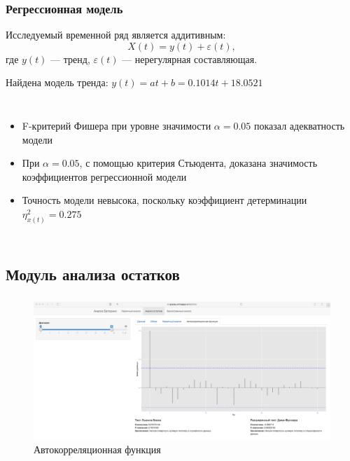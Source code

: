 \documentclass[notheorems]{beamer}
\theoremstyle{definition}
\theoremstyle{example}
\theoremstyle{plain}
\begin{document}
\begin{frame}
  \frametitle{Регрессионная модель}
  Исследуемый временной ряд является аддитивным:
  \begin{equation}
    X(t) = y(t) + \varepsilon(t),
  \end{equation}
  где $ y(t) $ --- тренд, $ \varepsilon(t) $ --- нерегулярная составляющая.

  \vspace{0.2em}

  \begin{center}
    Найдена модель тренда: $ y(t) = at + b = 0.1014t + 18.0521 $
  \end{center}
  \begin{columns}[c]
  {\footnotesize
  \begin{itemize}
    \item F-критерий Фишера при уровне значимости $ \alpha = 0.05 $ показал адекватность модели
    \item При $ \alpha=0.05 $, с помощью критерия Стьюдента, доказана значимость коэффициентов регрессионной модели
    \item Точность модели невысока, поскольку коэффициент детерминации $ \eta^2_{x(t)} = 0.275 $
  \end{itemize}
  }
  {\footnotesize
  
  }
  \end{columns}
\end{frame}

\subsection{Модуль анализа остатков}

\begin{frame}
  \frametitle{\large\secname}
  \framesubtitle{\subsecname}
    \begin{figure}[h]
    \includegraphics[width=1\textwidth]{../../figures/static/3_acf.png}
    \caption{Автокорреляционная функция}
  \end{figure}
\end{frame}
\end{document}
